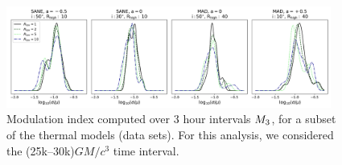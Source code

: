\begin{figure}
  \centering
  \includegraphics[width=0.95\textwidth]{figures/mi_rlow_select_models.png}
  \caption{Modulation index computed over 3 hour intervals $M_{3}$, for a subset of the thermal models (\kharma data sets). For this analysis, we considered the (25k--30k)$GM/c^{3}$ time interval.}
  \label{fig:mi_rlow}
\end{figure}


